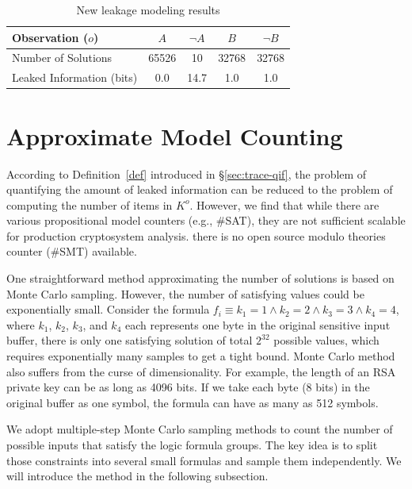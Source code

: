 \begin{table}[ht]
    \centering\small\footnotesize
    \caption{New leakage modeling results}
    \label{shtable2}
    \vspace*{-9pt}
    \begin{tabular}{l|cc|cc}
        \hline

        Observation ($o$)         & $A$   & $\neg A$ & $B$   & $\neg B$ \\ \hline
        Number of Solutions       & 65526 & 10       & 32768 & 32768    \\ \hline
        Leaked Information (bits) & 0.0   & 14.7     & 1.0   & 1.0      \\
        \hline
    \end{tabular}
\end{table}
\section{Approximate Model Counting}
\label{MCreasons}
According to
Definition~\ref{def} introduced in \S\ref{sec:trace-qif},
the problem of quantifying the amount of leaked information can be reduced to
the problem of computing the number of items in $K^o$. However, we find that while
there are various propositional model counters (e.g., \#SAT), they are not
sufficient scalable for production cryptosystem analysis.
there is no open source modulo theories counter (\#SMT) available.

One straightforward method approximating the number of solutions is based on Monte Carlo
sampling. However, the number of satisfying values could be exponentially small.
Consider the formula $f_i\equiv{k_1} = 1\land{k_2} = 2\land{k_3} = 3\land{k_4} =
    4$, where $k_1$, $k_2$, $k_3$, and $k_4$ each represents one byte in the
original sensitive input buffer, there is only one satisfying solution of total
$2^{32}$ possible values, which requires exponentially many samples to get a
tight bound. Monte Carlo method also suffers from the curse of dimensionality.
For example, the length of an RSA private key can be as long as 4096 bits. If we
take each byte (8 bits) in the original buffer as one symbol, the formula can
have as many as 512 symbols.

We adopt multiple-step Monte Carlo sampling methods to count the number of
possible inputs that satisfy the logic formula groups. The key idea is to split
those constraints into several small formulas and sample them independently.
We will introduce the method in the following subsection.

